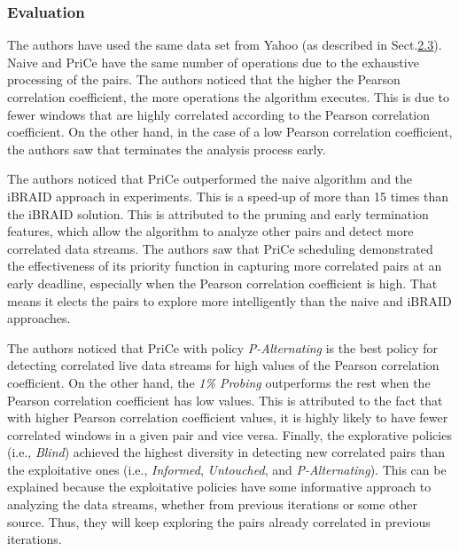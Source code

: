 \subsubsection{Evaluation}
The authors have used the same data set from Yahoo (as described in Sect.\hyperref[sec:iBRAID]{2.3}). Naive and PriCe have the same number of operations due to the exhaustive processing of the pairs. The authors noticed that the higher the Pearson correlation coefficient, the more operations the algorithm executes. This is due to fewer windows that are highly correlated according to the Pearson correlation coefficient. On the other hand, in the case of a low Pearson correlation coefficient, the authors saw that terminates the analysis process early.\newline

The authors noticed that PriCe outperformed the naive algorithm and the iBRAID approach in experiments. This is a speed-up of more than 15 times than the iBRAID solution. This is attributed to the pruning and early termination features, which allow the algorithm to analyze other pairs and detect more correlated data streams. The authors saw that PriCe scheduling demonstrated the effectiveness of its priority function in capturing more correlated pairs at an early deadline, especially when the Pearson correlation coefficient is high. That means it elects the pairs to explore more intelligently than the naive and iBRAID approaches.\newline

The authors noticed that PriCe with policy \textit{P-Alternating} is the best policy for detecting correlated live data streams for high values of the Pearson correlation coefficient. On the other hand, the \textit{1\% Probing} outperforms the rest when the Pearson correlation coefficient has low values. This is attributed to the fact that with higher Pearson correlation coefficient values, it is highly likely to have fewer correlated windows in a given pair and vice versa. Finally, the explorative policies (i.e., \textit{Blind}) achieved the highest diversity in detecting new correlated pairs than the exploitative ones (i.e., \textit{Informed}, \textit{Untouched}, and \textit{P-Alternating}). This can be explained because the exploitative policies have some informative approach to analyzing the data streams, whether from previous iterations or some other source. Thus, they will keep exploring the pairs already correlated in previous iterations.